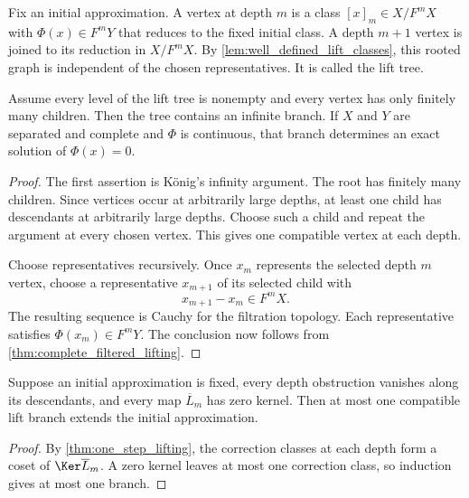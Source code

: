 \begin{definition}\label{def:lift_tree}
Fix an initial approximation.  A vertex at depth $m$ is a class $[x]_m\in X/F^mX$ with $\Phi(x)\in F^mY$ that reduces to the fixed initial class.  A depth $m+1$ vertex is joined to its reduction in $X/F^mX$.  By \cref{lem:well_defined_lift_classes}, this rooted graph is independent of the chosen representatives.  It is called the lift tree.
\end{definition}

\begin{theorem}\label{thm:finitely_branching_lift_tree}
Assume every level of the lift tree is nonempty and every vertex has only finitely many children.  Then the tree contains an infinite branch.  If $X$ and $Y$ are separated and complete and $\Phi$ is continuous, that branch determines an exact solution of $\Phi(x)=0$.
\end{theorem}

\begin{proof}
The first assertion is K\"onig's infinity argument.  The root has finitely many children.  Since vertices occur at arbitrarily large depths, at least one child has descendants at arbitrarily large depths.  Choose such a child and repeat the argument at every chosen vertex.  This gives one compatible vertex at each depth.

Choose representatives recursively.  Once $x_m$ represents the selected depth $m$ vertex, choose a representative $x_{m+1}$ of its selected child with
\[
x_{m+1}-x_m\in F^mX.
\]
The resulting sequence is Cauchy for the filtration topology.  Each representative satisfies $\Phi(x_m)\in F^mY$.  The conclusion now follows from \cref{thm:complete_filtered_lifting}.
\end{proof}

\begin{corollary}\label{cor:unique_lift_branch}
Suppose an initial approximation is fixed, every depth obstruction vanishes along its descendants, and every map $\overline L_m$ has zero kernel.  Then at most one compatible lift branch extends the initial approximation.
\end{corollary}

\begin{proof}
By \cref{thm:one_step_lifting}, the correction classes at each depth form a coset of $\Ker\overline L_m$.  A zero kernel leaves at most one correction class, so induction gives at most one branch.
\end{proof}

